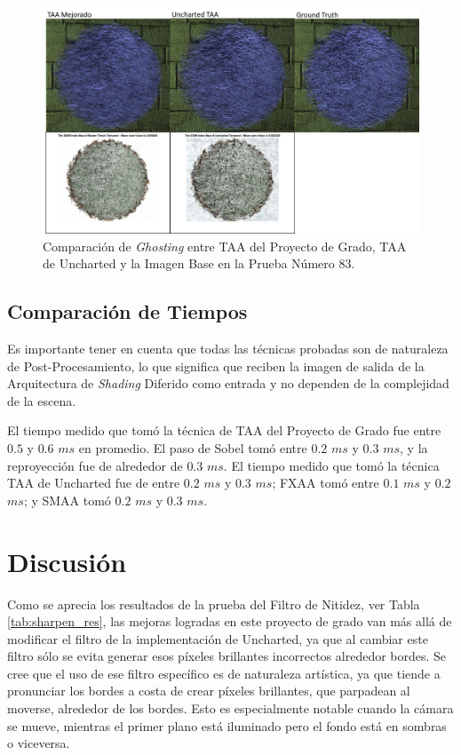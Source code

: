 \documentclass[pregrado]{tesis-usb} %
\begin{document}
\begin{figure}[!htb]
	\centering
	\includegraphics[scale=0.4]{images/results/hairball_ghosting_lighted.png}
	\caption{Comparación de \textit{Ghosting} entre TAA del Proyecto de Grado, TAA de Uncharted y la Imagen Base en la Prueba Número 83.}\label{fig:hairball_ghosting_lighted}
\end{figure}

\FloatBarrier
\subsection{Comparación de Tiempos} \label{result_timing}
Es importante tener en cuenta que todas las técnicas probadas son de naturaleza de Post-Procesamiento, lo que significa que reciben la imagen de salida de la Arquitectura de \textit{Shading} Diferido como entrada y no dependen de la complejidad de la escena.

El tiempo medido que tomó la técnica de TAA del Proyecto de Grado fue entre $0.5$ y $0.6$ $ms$ en promedio. El paso de Sobel tomó entre $0.2$ $ms$ y $0.3$ $ms$, y la reproyección fue de alrededor de $0.3$ $ms$. El tiempo medido que tomó la técnica TAA de Uncharted fue de entre $0.2$ $ms$ y $0.3$ $ms$; FXAA tomó entre $0.1$ $ms$ y $0.2$ $ms$; y SMAA tomó $0.2$ $ms$ y $0.3$ $ms$.


\section{Discusión}
Como se aprecia los resultados de la prueba del Filtro de Nitidez, ver Tabla \ref{tab:sharpen_res}, las mejoras logradas en este proyecto de grado van más allá de modificar el filtro de la implementación de Uncharted, ya que al cambiar este filtro sólo se evita generar esos píxeles brillantes incorrectos alrededor bordes. Se cree que el uso de ese filtro específico es de naturaleza artística, ya que tiende a pronunciar los bordes a costa de crear píxeles brillantes, que parpadean al moverse, alrededor de los bordes. Esto es especialmente notable cuando la cámara se mueve, mientras el primer plano está iluminado pero el fondo está en sombras o viceversa.
\end{document}
